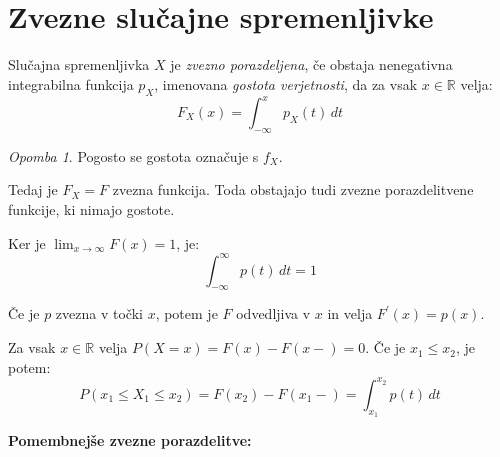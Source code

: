 \documentclass[12pt]{book}
\def\n{\noindent}
\theoremstyle{definition}
\theoremstyle{plain}
\theoremstyle{plain}
\theoremstyle{plain}
\theoremstyle{remark}
\newtheorem*{opomba}{Opomba}
\begin{document}
\section{Zvezne slučajne spremenljivke}

Slučajna spremenljivka $X$ je \emph{zvezno porazdeljena}, če obstaja nenegativna integrabilna funkcija $p_X$, imenovana \emph{gostota verjetnosti}, da za vsak $x \in \mathbb{R}$ velja:
$$
F_X(x)=\int_{-\infty}^x p_X(t) \, d t
$$

\begin{opomba}
    Pogosto se gostota označuje s $f_X$.   
\end{opomba}
  
\n Tedaj je $F_X=F$ zvezna funkcija. Toda obstajajo tudi zvezne porazdelitvene funkcije, ki nimajo gostote.

\n Ker je $\lim _{x \rightarrow \infty} F(x)=1$, je: 
$$
\int_{-\infty}^{\infty} p(t) \, d t=1
$$ 

\n Če je $p$ zvezna v točki $x$, potem je $F$ odvedljiva v $x$ in velja $F^{\prime}(x)=p(x)$. 

\n Za vsak $x \in \mathbb{R}$ velja $P(X=x)=F(x)-F(x-)=0$. Če je $x_1 \leq x_2$, je potem:
$$
P\left(x_1 \leq X_1 \leq x_2\right)=F\left(x_2\right)-F\left(x_1-\right)=\int_{x_1}^{x_2} p(t) \, d t
$$

\n \textbf{Pomembnejše zvezne porazdelitve:}
\end{document}
